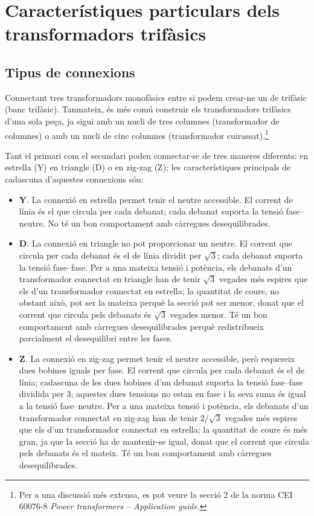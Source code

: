 \section{Característiques particulars  dels transformadors trifàsics}\label{sec:caract-trans-trif}

\subsection{Tipus de connexions}


Connectant tres transformadors monofàsics entre si podem crear-ne un de trifàsic (banc trifàsic). Tanmateix, és més comú construir els transformadors trifàsics d'una sola peça, ja sigui amb un nucli de tres columnes (transformador de columnes) o amb un nucli de cinc columnes (transformador cuirassat).\footnote{Per a una discussió més extensa, es pot veure la secció 2 de la norma CEI 60076-8 \emph{Power transformers -- Application guide}.}

Tant el primari com el secundari poden connectar-se de tres maneres diferents: en estrella (Y) en triangle (D) o en zig-zag (Z); les característiques principals de cadascuna d'aquestes connexions són:

\begin{itemize}
   \item \textbf{Y}. La connexió en estrella permet tenir el neutre accessible. El corrent de línia és el que circula per cada debanat; cada debanat suporta la tensió fase--neutre. No té un bon comportament amb càrregues desequilibrades.
   \item \textbf{D}. La connexió en triangle no pot proporcionar un neutre. El corrent que circula per cada debanat és el de línia dividit per $\sqrt{3}$; cada debanat suporta la tensió fase--fase. Per a una mateixa tensió i potència, els debanats d'un transformador connectat en triangle han de tenir $\sqrt{3}$ vegades més espires que els d'un transformador connectat en estrella; la quantitat de coure, no obstant això, pot ser la mateixa perquè la secció pot ser menor, donat que el corrent que circula pels debanats és $\sqrt{3}$ vegades menor. Té un bon comportament amb càrregues desequilibrades perquè redistribueix parcialment el desequilibri entre les fases.
   \item \textbf{Z}. La connexió en zig-zag permet tenir el neutre accessible, però requereix dues bobines iguals per fase. El corrent que circula per cada debanat és el de línia; cadascuna de les dues bobines d'un debanat suporta la tensió fase--fase dividida per 3; aquestes dues tensions no estan en fase i la seva suma és igual a la tensió fase--neutre. Per a una mateixa tensió i potència, els debanats d'un transformador connectat en zig-zag han de tenir $2/\sqrt{3}$ vegades més espires que els d'un transformador connectat en estrella; la quantitat de coure és més gran, ja que la secció ha de mantenir-se igual, donat que el corrent que circula pels debanats és el mateix. Té un bon comportament amb càrregues desequilibrades.
\end{itemize}

